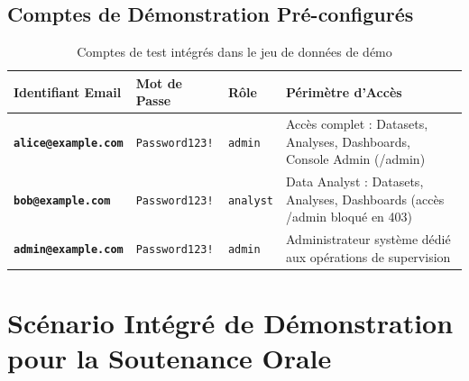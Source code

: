 \documentclass[11pt,a4paper]{article}
\begin{document}
\subsection{Comptes de Démonstration Pré-configurés}
\begin{table}[h!]
\centering
\small
\renewcommand{\arraystretch}{1.2}
\begin{tabularx}{\textwidth}{>{\bfseries}p{3.8cm} p{2.8cm} p{2.0cm} X}
    \toprule
    \rowcolor{tableheader}
    \color{white}Identifiant Email & \color{white}Mot de Passe & \color{white}Rôle & \color{white}Périmètre d'Accès \\
    \midrule
    \texttt{alice@example.com} & \texttt{Password123!} & \texttt{admin} & Accès complet : Datasets, Analyses, Dashboards, Console Admin (/admin) \\
    \rowcolor{tablerowalt}
    \texttt{bob@example.com} & \texttt{Password123!} & \texttt{analyst} & Data Analyst : Datasets, Analyses, Dashboards (accès /admin bloqué en 403) \\
    \texttt{admin@example.com} & \texttt{Password123!} & \texttt{admin} & Administrateur système dédié aux opérations de supervision \\
    \bottomrule
\end{tabularx}
\caption{Comptes de test intégrés dans le jeu de données de démo}
\end{table}

\section{Scénario Intégré de Démonstration pour la Soutenance Orale}
\end{document}
